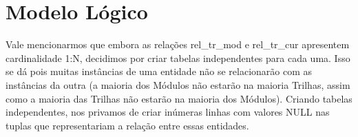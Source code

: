 \documentclass{article}
\begin{document}
    \section{Modelo Lógico}
    \quad Vale mencionarmos que embora as relações rel\_tr\_mod e rel\_tr\_cur apresentem cardinalidade 1:N, decidimos por criar tabelas independentes para cada uma. Isso se dá pois muitas instâncias de uma entidade não se relacionarão com as instâncias da outra (a maioria dos Módulos não estarão na maioria Trilhas, assim como a maioria das Trilhas não estarão na maioria dos Módulos). Criando tabelas independentes, nos privamos de criar inúmeras linhas com valores NULL nas tuplas que representariam a relação entre essas entidades.
\end{document}
